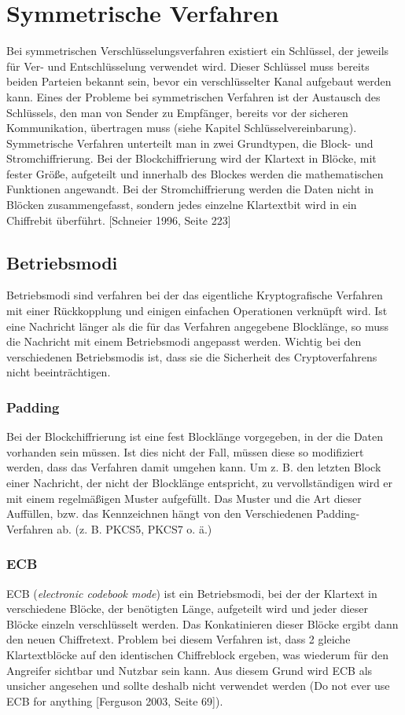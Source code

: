 \documentclass[10pt, a4paper]{scrreprt}
\begin{document}
\section{Symmetrische Verfahren}
Bei symmetrischen Verschlüsselungsverfahren existiert ein Schlüssel, der jeweils für Ver- und Entschlüsselung verwendet wird. Dieser Schlüssel muss bereits beiden Parteien bekannt sein, bevor ein verschlüsselter Kanal aufgebaut werden kann. Eines der Probleme bei symmetrischen Verfahren ist der Austausch des Schlüssels, den man von Sender zu Empfänger, bereits vor der sicheren Kommunikation, übertragen muss (siehe Kapitel Schlüsselvereinbarung). Symmetrische Verfahren unterteilt man in zwei Grundtypen, die Block- und Stromchiffrierung. Bei der Blockchiffrierung wird der Klartext in Blöcke, mit fester Größe, aufgeteilt und innerhalb des Blockes werden die mathematischen Funktionen angewandt. Bei der Stromchiffrierung werden die Daten nicht in Blöcken zusammengefasst, sondern jedes einzelne Klartextbit wird in ein Chiffrebit überführt. [Schneier 1996, Seite 223] 

\subsection{Betriebsmodi}
Betriebsmodi sind verfahren bei der das eigentliche Kryptografische Verfahren mit einer Rückkopplung und einigen einfachen Operationen verknüpft wird. Ist eine Nachricht länger als die für das Verfahren angegebene Blocklänge, so muss die Nachricht mit einem Betriebsmodi angepasst werden. Wichtig bei den verschiedenen Betriebsmodis ist, dass sie die Sicherheit des Cryptoverfahrens nicht beeinträchtigen.

\subsubsection{Padding}
Bei der Blockchiffrierung ist eine fest Blocklänge vorgegeben, in der die Daten vorhanden sein müssen. Ist dies nicht der Fall, müssen diese so modifiziert werden, dass das Verfahren damit umgehen kann.
Um z. B. den letzten Block einer Nachricht, der nicht der Blocklänge entspricht, zu vervollständigen wird er mit einem regelmäßigen Muster aufgefüllt. Das Muster und die Art dieser Auffüllen, bzw. das Kennzeichnen hängt von den Verschiedenen Padding-Verfahren ab. (z. B. PKCS5, PKCS7 o. ä.)

\subsubsection{ECB}
ECB (\textit{electronic codebook mode}) ist ein Betriebsmodi, bei der der Klartext in verschiedene Blöcke, der benötigten Länge, aufgeteilt wird und jeder dieser Blöcke einzeln verschlüsselt werden. Das Konkatinieren dieser Blöcke ergibt dann den neuen Chiffretext. Problem bei diesem Verfahren ist, dass 2 gleiche Klartextblöcke auf den identischen Chiffreblock ergeben, was wiederum für den Angreifer sichtbar und Nutzbar sein kann. Aus diesem Grund wird ECB als unsicher angesehen und sollte deshalb nicht verwendet werden (Do not ever use ECB for anything [Ferguson 2003, Seite 69]).
\end{document}
